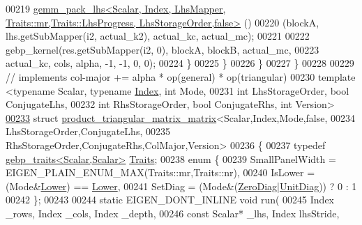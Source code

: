 \begin{DoxyCode}
00219           
      \hyperlink{struct_eigen_1_1internal_1_1gemm__pack__lhs}{gemm\_pack\_lhs<Scalar, Index, LhsMapper, Traits::mr,Traits::LhsProgress, LhsStorageOrder,false>}
      ()
00220             (blockA, lhs.getSubMapper(i2, actual\_k2), actual\_kc, actual\_mc);
00221 
00222           gebp\_kernel(res.getSubMapper(i2, 0), blockA, blockB, actual\_mc,
00223                       actual\_kc, cols, alpha, -1, -1, 0, 0);
00224         \}
00225       \}
00226     \}
00227   \}
00228 
00229 \textcolor{comment}{// implements col-major += alpha * op(general) * op(triangular)}
00230 \textcolor{keyword}{template} <\textcolor{keyword}{typename} Scalar, \textcolor{keyword}{typename} \hyperlink{namespace_eigen_a62e77e0933482dafde8fe197d9a2cfde}{Index}, \textcolor{keywordtype}{int} Mode,
00231           \textcolor{keywordtype}{int} LhsStorageOrder, \textcolor{keywordtype}{bool} ConjugateLhs,
00232           \textcolor{keywordtype}{int} RhsStorageOrder, \textcolor{keywordtype}{bool} ConjugateRhs, \textcolor{keywordtype}{int} Version>
\hyperlink{struct_eigen_1_1internal_1_1product__triangular__matrix__matrix_3_01_scalar_00_01_index_00_01_mo073ec17ef20b8a50e2a38e240dd8d795}{00233} \textcolor{keyword}{struct }\hyperlink{struct_eigen_1_1internal_1_1product__triangular__matrix__matrix}{product\_triangular\_matrix\_matrix}<Scalar,Index,Mode,false,
00234                                         LhsStorageOrder,ConjugateLhs,
00235                                         RhsStorageOrder,ConjugateRhs,ColMajor,Version>
00236 \{
00237   \textcolor{keyword}{typedef} \hyperlink{class_eigen_1_1internal_1_1gebp__traits}{gebp\_traits<Scalar,Scalar>} \hyperlink{class_eigen_1_1internal_1_1gebp__traits}{Traits};
00238   \textcolor{keyword}{enum} \{
00239     SmallPanelWidth   = EIGEN\_PLAIN\_ENUM\_MAX(Traits::mr,Traits::nr),
00240     IsLower = (Mode&\hyperlink{group__enums_gga39e3366ff5554d731e7dc8bb642f83cda891792b8ed394f7607ab16dd716f60e6}{Lower}) == \hyperlink{group__enums_gga39e3366ff5554d731e7dc8bb642f83cda891792b8ed394f7607ab16dd716f60e6}{Lower},
00241     SetDiag = (Mode&(\hyperlink{group__enums_gga39e3366ff5554d731e7dc8bb642f83cda884ff7240392e85aa6e4b3c957e36483}{ZeroDiag}|\hyperlink{group__enums_gga39e3366ff5554d731e7dc8bb642f83cdaddb72f888ac85d5a1c52333e54f9374b}{UnitDiag})) ? 0 : 1
00242   \};
00243 
00244   \textcolor{keyword}{static} EIGEN\_DONT\_INLINE \textcolor{keywordtype}{void} run(
00245     Index \_rows, Index \_cols, Index \_depth,
00246     \textcolor{keyword}{const} Scalar* \_lhs, Index lhsStride,

\end{DoxyCode}
